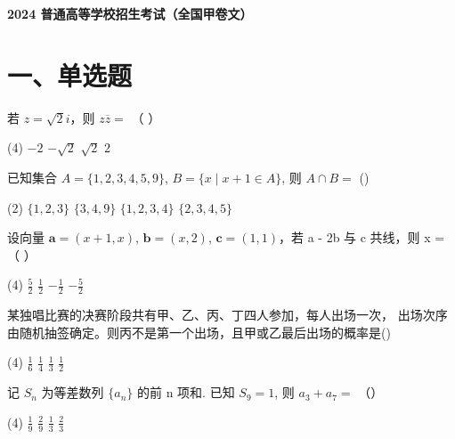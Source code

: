 \documentclass[UTF8,12pt]{ctexart}
\newcommand{\examtitle}{2024 普通高等学校招生考试（全国甲卷文）}
\newcommand{\makeexamtitle}{%
  \begin{center}
    {\LARGE\bfseries\examtitle}\par
  \end{center}\vspace{0.4em}}
\begin{document}
\makeexamtitle

\section*{一、单选题}

\begin{questions}

  \item 若 $z = \sqrt{2}i$，则 $z\overline{z} =$ （ ）

    \begin{tasks}(4)
      \task $-2$
      \task $-\sqrt{2}$
      \task $\sqrt{2}$
      \task $2$
    \end{tasks}

  \item 已知集合 $A = \{1, 2, 3, 4, 5, 9\}$, $B = \{x \mid x + 1 \in A\}$, 则
    $A \cap B =$ ()

    \begin{tasks}(2)
      \task $\{1, 2, 3\}$
      \task $\{3, 4, 9\}$
      \task $\{1, 2, 3, 4\}$
      \task $\{2, 3, 4, 5\}$
    \end{tasks}

  \item 设向量 $\boldsymbol{a} = (x + 1, x)$, $\boldsymbol{b} = (x, 2)$,
    $\boldsymbol{c} = (1, 1)$，若 a - 2b 与 c 共线，则 x = （ ）

    \begin{tasks}(4)
      \task $\frac{5}{2}$
      \task $\frac{1}{2}$
      \task $-\frac{1}{2}$
      \task $-\frac{5}{2}$
    \end{tasks}

  \item 某独唱比赛的决赛阶段共有甲、乙、丙、丁四人参加，每人出场一次，
    出场次序由随机抽签确定。则丙不是第一个出场，且甲或乙最后出场的概率是()

    \begin{tasks}(4)
      \task $\frac{1}{6}$
      \task $\frac{1}{4}$
      \task $\frac{1}{3}$
      \task $\frac{1}{2}$
    \end{tasks}

  \item 记 $S_{n}$ 为等差数列 $\{a_{n}\}$ 的前 n 项和. 已知 $S_{9}=1$, 则 $a_{3}+a_{7}=$
    （）

    \begin{tasks}(4)
      \task $\frac{1}{9}$
      \task $\frac{2}{9}$
      \task $\frac{1}{3}$
      \task $\frac{2}{3}$
    \end{tasks}


\end{questions}
\end{document}
